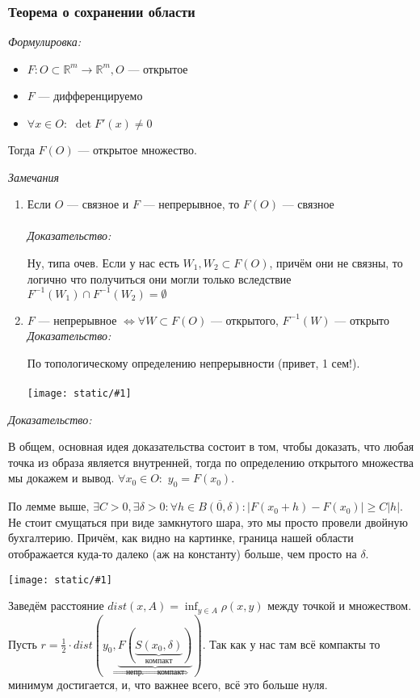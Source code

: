 \documentclass{article}
\def\dbl{\,\,}
\def\image#1{\texttt{[image: static/\#1]}}
\begin{document}
\subsubsection{Теорема о сохранении области}

\textit{Формулировка:}
\begin{itemize}
    \item $F: O \subset \mathbb{R}^m \rightarrow \mathbb{R}^m, O$ --- открытое
    \item $F$ --- дифференцируемо
    \item $\forall x \in O: \dbl \det F'(x) \neq 0$
\end{itemize}

Тогда $F(O)$ --- открытое множество.

\textit{Замечания}
\begin{enumerate}
    \item Если $O$ --- связное и $F$ --- непрерывное, то $F(O)$ --- связное\\\\
    \textit{Доказательство:}

    Ну, типа очев. Если у нас есть $W_1, W_2 \subset F(O)$, причём они не связны, то логично что получиться они могли только вследствие $F^{-1}(W_1) \cap F^{-1}(W_2) = \emptyset$
    \item $F$ --- непрерывное $\Leftrightarrow \forall W \subset F(O)$ --- открытого, $F^{-1}(W)$ --- открыто
    \textit{Доказательство:}

    По топологическому определению непрерывности (привет, 1 сем!).\\\\
    \image{sohr_obl_1.png}
\end{enumerate}


\textit{Доказательство:}

В общем, основная идея доказательства состоит в том, чтобы доказать, что любая точка из образа является внутренней, тогда по определению открытого множества мы докажем и вывод.
$\forall x_0 \in O: \dbl y_0 = F(x_0)$. 

По лемме выше, $\exists C > 0, \exists \delta > 0: \forall h \in \overline{B(0, \delta)}: |F(x_0 + h) - F(x_0)| \ge C|h|$. Не стоит смущаться при виде замкнутого шара, это мы просто провели двойную бухгалтерию. Причём, как видно на картинке, граница нашей области отображается куда-то далеко (аж на константу) больше, чем просто на $\delta$.

\image{sohr_obl_2.png}

Заведём расстояние $dist(x, A) = \inf_{y \in A} \rho(x, y)$ между точкой и множеством. Пусть $r = \frac{1}{2} \cdot dist(y_0, \underbrace{F(\underbrace{S(x_0, \delta)}_{\text{компакт}})}_{\text{непр. } \Rightarrow \text{ компакт}})$. Так как у нас там всё компакты то минимум достигается, и, что важнее всего, всё это больше нуля.
\end{document}
